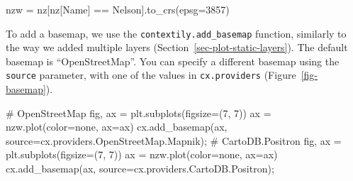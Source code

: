 \documentclass[
  letterpaper,
]{krantz}
\newenvironment{Shaded}{\begin{snugshade}}{\end{snugshade}}
\newcommand{\CommentTok}[1]{\textcolor[rgb]{0.37,0.37,0.37}{#1}}
\newcommand{\DecValTok}[1]{\textcolor[rgb]{0.68,0.00,0.00}{#1}}
\newcommand{\NormalTok}[1]{\textcolor[rgb]{0.00,0.23,0.31}{#1}}
\newcommand{\OperatorTok}[1]{\textcolor[rgb]{0.37,0.37,0.37}{#1}}
\newcommand{\StringTok}[1]{\textcolor[rgb]{0.13,0.47,0.30}{#1}}
\begin{document}
\begin{Shaded}
\begin{Highlighting}[]
\NormalTok{nzw }\OperatorTok{=}\NormalTok{ nz[nz[}\StringTok{\textquotesingle{}Name\textquotesingle{}}\NormalTok{] }\OperatorTok{==} \StringTok{\textquotesingle{}Nelson\textquotesingle{}}\NormalTok{].to\_crs(epsg}\OperatorTok{=}\DecValTok{3857}\NormalTok{)}
\end{Highlighting}
\end{Shaded}

To add a basemap, we use the \texttt{contextily.add\_basemap} function,
similarly to the way we added multiple layers
(Section~\ref{sec-plot-static-layers}). The default basemap is
``OpenStreetMap''. You can specify a different basemap using the
\texttt{source} parameter, with one of the values in
\texttt{cx.providers} (Figure~\ref{fig-basemap}).

\begin{Shaded}
\begin{Highlighting}[]
\CommentTok{\# OpenStreetMap}
\NormalTok{fig, ax }\OperatorTok{=}\NormalTok{ plt.subplots(figsize}\OperatorTok{=}\NormalTok{(}\DecValTok{7}\NormalTok{, }\DecValTok{7}\NormalTok{))}
\NormalTok{ax }\OperatorTok{=}\NormalTok{ nzw.plot(color}\OperatorTok{=}\StringTok{\textquotesingle{}none\textquotesingle{}}\NormalTok{, ax}\OperatorTok{=}\NormalTok{ax)}
\NormalTok{cx.add\_basemap(ax, source}\OperatorTok{=}\NormalTok{cx.providers.OpenStreetMap.Mapnik)}\OperatorTok{;}
\CommentTok{\# CartoDB.Positron}
\NormalTok{fig, ax }\OperatorTok{=}\NormalTok{ plt.subplots(figsize}\OperatorTok{=}\NormalTok{(}\DecValTok{7}\NormalTok{, }\DecValTok{7}\NormalTok{))}
\NormalTok{ax }\OperatorTok{=}\NormalTok{ nzw.plot(color}\OperatorTok{=}\StringTok{\textquotesingle{}none\textquotesingle{}}\NormalTok{, ax}\OperatorTok{=}\NormalTok{ax)}
\NormalTok{cx.add\_basemap(ax, source}\OperatorTok{=}\NormalTok{cx.providers.CartoDB.Positron)}\OperatorTok{;}
\end{Highlighting}
\end{Shaded}
\end{document}
